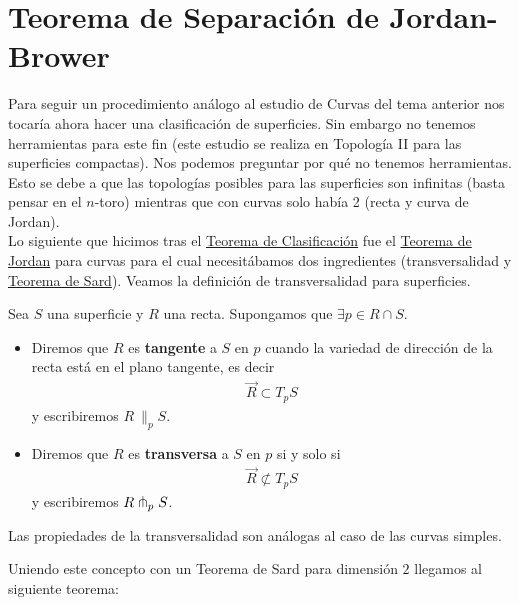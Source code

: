 \section{Teorema de Separación de Jordan-Brower}

Para seguir un procedimiento análogo al estudio de Curvas del tema anterior nos tocaría ahora hacer una clasificación de superficies. Sin embargo no tenemos herramientas para este fin (este estudio se realiza en Topología II para las superficies compactas). Nos podemos preguntar por qué no tenemos herramientas. Esto se debe a que las topologías posibles para las superficies son infinitas (basta pensar en el $n$-toro) mientras que con curvas solo había 2 (recta y curva de Jordan).\\

Lo siguiente que hicimos tras el \hyperref[teo:clasif]{Teorema de Clasificación} fue el \hyperref[teo:curva_jordan]{Teorema de Jordan} para curvas para el cual necesitábamos dos ingredientes (transversalidad y \hyperref[teo:sard]{Teorema de Sard}). Veamos la definición de transversalidad para superficies.

\begin{definicion}
    Sea $S$ una superficie y $R$ una recta. Supongamos que $\exists p\in R\cap S$. 
    \begin{itemize}
        \item Diremos que $R$ es \textbf{tangente} a $S$ en $p$ cuando la variedad de dirección de la recta está en el plano tangente, es decir
        \begin{gather*}
            \vec{R}\subset T_pS
        \end{gather*}
        y escribiremos $R\ \|_p S$.

        \item Diremos que $R$ es \textbf{transversa} a $S$ en $p$ si y solo si 
        \begin{gather*}
            \vec{R} \not\subset T_pS
        \end{gather*}
        y escribiremos $R \pitchfork_p S$.
    \end{itemize}
\end{definicion}

\begin{observacion}
    Las propiedades de la transversalidad son análogas al caso de las curvas simples.
\end{observacion}

Uniendo este concepto con un Teorema de Sard para dimensión $2$ llegamos al siguiente teorema:

